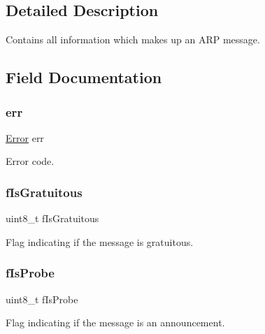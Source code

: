 \subsection{Detailed Description}
Contains all information which makes up an A\+RP message. 

\subsection{Field Documentation}
\mbox{\label{struct_a_r_pmessage__t_a9078d3b85b5a7c46fc5c80899bd3b6b3}} 
\subsubsection{\texorpdfstring{err}{err}}
{\footnotesize\ttfamily \mbox{\hyperlink{group__error_gada9d6bcf34dabaf048e197cb7b69fa6a}{Error}} err}



Error code. 

\mbox{\label{struct_a_r_pmessage__t_a10f6f518105e71039413d95c27db5a5d}} 
\subsubsection{\texorpdfstring{fIsGratuitous}{fIsGratuitous}}
{\footnotesize\ttfamily uint8\+\_\+t f\+Is\+Gratuitous}



Flag indicating if the message is gratuitous. 

\mbox{\label{struct_a_r_pmessage__t_ad84934498bc8cb014f7ccfd3df0eaaab}} 
\subsubsection{\texorpdfstring{fIsProbe}{fIsProbe}}
{\footnotesize\ttfamily uint8\+\_\+t f\+Is\+Probe}



Flag indicating if the message is an announcement. 

\mbox{\label{struct_a_r_pmessage__t_aff25a69752648654e56c4ff3e0b1b226}} 
